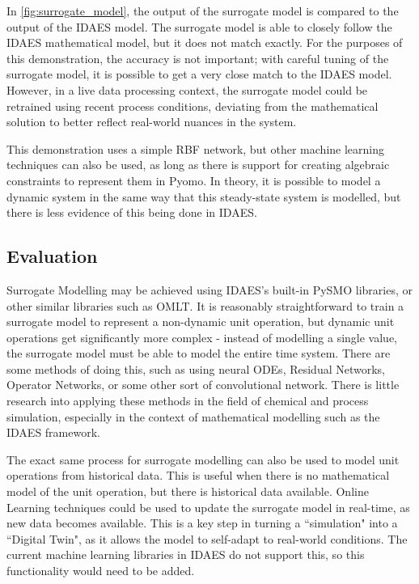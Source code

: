 \documentclass[12pt]{article}
\begin{document}
In \cref{fig:surrogate_model}, the output of the surrogate model is compared to the output of the IDAES model. The surrogate model is able to closely follow the IDAES mathematical model, but it does not match exactly. For the purposes of this demonstration, the accuracy is not important; with careful tuning of the surrogate model, it is possible to get a very close match to the IDAES model. However, in a live data processing context, the surrogate model could be retrained using recent process conditions, deviating from the mathematical solution to better reflect real-world nuances in the system. 

This demonstration uses a simple RBF network, but other machine learning techniques can also be used, as long as there is support for creating algebraic constraints to represent them in Pyomo. In theory, it is possible to model a dynamic system in the same way that this steady-state system is modelled, but there is less evidence of this being done in IDAES.

\subsection{Evaluation}



Surrogate Modelling may be achieved using IDAES's built-in PySMO libraries, or other similar libraries such as OMLT. 
It is reasonably straightforward to train a surrogate model to represent a non-dynamic unit operation, but dynamic unit operations get significantly more complex - instead of modelling a single value, the surrogate model must be able to model the entire time system. There are some methods of doing this, such as using neural ODEs, Residual Networks, Operator Networks, or some other sort of convolutional network. 
There is little research into applying these methods in the field of chemical and process simulation, especially in the context of mathematical modelling such as the IDAES framework.

The exact same process for surrogate modelling can also be used to model unit operations from historical data. 
This is useful when there is no mathematical model of the unit operation, but there is historical data available. 
Online Learning techniques could be used to update the surrogate model in real-time, as new data becomes available. This is a key step in turning a ``simulation" into a ``Digital Twin", as it allows the model to self-adapt to real-world conditions. The current machine learning libraries in IDAES do not support this, so this functionality would need to be added.
\end{document}
